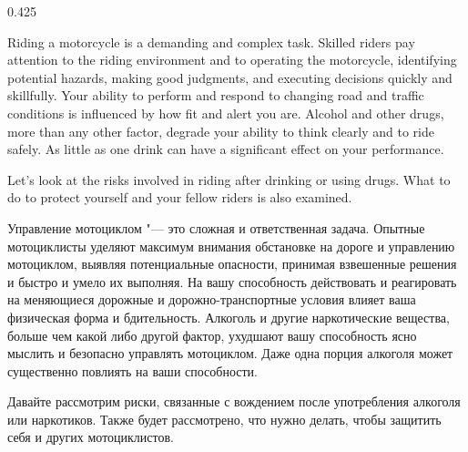 

\begin{langblock}{0.425}
	\begin{eng}
	
	Riding a motorcycle is a demanding and complex task. Skilled riders pay attention to the riding environment and to operating the motorcycle, identifying potential hazards, making good judgments, and executing decisions quickly and skillfully. Your ability to perform and respond to changing road and traffic conditions is influenced by how fit and alert you are. Alcohol and other drugs, more than any other factor, degrade your ability to think clearly and to ride safely.  As little as one drink can have a significant effect on your performance.
	
	Let's look at the risks involved in riding after drinking or using drugs. What to do to protect yourself and your fellow riders is also examined.
	\end{eng}
	\begin{rus}
		
		Управление мотоциклом "--- это сложная и ответственная задача. Опытные мотоциклисты уделяют максимум внимания обстановке на дороге и управлению мотоциклом, выявляя потенциальные опасности, принимая взвешенные решения и быстро и умело их выполняя. На вашу способность действовать и реагировать на меняющиеся дорожные и дорожно-транспортные условия влияет ваша физическая форма и бдительность. Алкоголь и другие наркотические вещества, больше чем какой либо другой фактор, ухудшают вашу способность ясно мыслить и безопасно управлять мотоциклом. Даже одна порция алкоголя может существенно повлиять на ваши способности.
		
		Давайте рассмотрим риски, связанные с вождением после употребления алкоголя или наркотиков. Также будет рассмотрено, что нужно делать, чтобы защитить себя и других мотоциклистов.
\end{rus}
\end{langblock}






